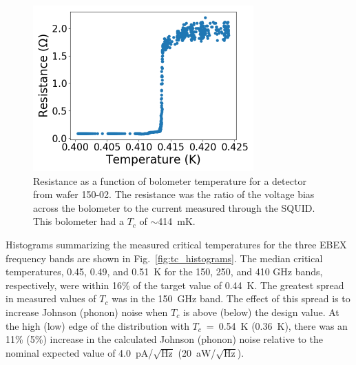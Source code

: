 
\begin{figure}[htbp]
\begin{center}
\includegraphics[height=2.5in]{figures/b53w0c0_rvst.png}
\caption{Resistance as a function of bolometer temperature for a detector from wafer 150-02. The resistance was the ratio of the voltage bias across the bolometer to the current measured through the \ac{SQUID}. This bolometer had a $T_{c}$ of $\sim$414~mK. 
\label{fig:tc_measurement} }
\end{center}
\end{figure} 

Histograms summarizing the measured critical temperatures for the three \ac{EBEX} frequency bands are shown in Fig.~\ref{fig:tc_histograms}. 
The median critical temperatures, 0.45, 0.49, and 0.51~K for the 150, 250, and 410 GHz bands, respectively, were within 16\% of the target value of 0.44~K. 
The greatest spread in measured values of $T_{c}$ was in the 150~GHz band. 
The effect of this spread is to increase Johnson (phonon) 
noise when $T_{c}$ is above (below) the design value. 
At the high (low) edge of the distribution with $T_{c}$~=~0.54~K (0.36~K), there was an 11\% (5\%) increase in the calculated Johnson (phonon) noise 
relative to the nominal expected value of 4.0~pA/$\sqrt{\mathrm{Hz}}$ (20~aW/$\sqrt{\mathrm{Hz}}$). 



